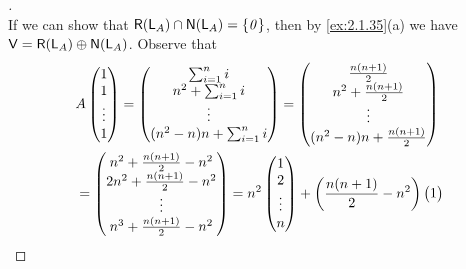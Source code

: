 \begin{proof}[]
\[	\]
	If we can show that \(\rg{\L_A} \cap \ns{\L_A} = \set{\zv}\), then by \cref{ex:2.1.35}(a) we have \(\V = \rg{\L_A} \oplus \ns{\L_A}\).
	Observe that
	\begin{align*}
		 & A \begin{pmatrix}
			     1      \\
			     1      \\
			     \vdots \\
			     1
		     \end{pmatrix} = \begin{pmatrix}
			                     \sum_{i = 1}^n i       \\
			                     n^2 + \sum_{i = 1}^n i \\
			                     \vdots                 \\
			                     (n^2 - n) n + \sum_{i = 1}^n i
		                     \end{pmatrix} = \begin{pmatrix}
			                                     \frac{n(n + 1)}{2}       \\
			                                     n^2 + \frac{n(n + 1)}{2} \\
			                                     \vdots                   \\
			                                     (n^2 - n) n + \frac{n(n + 1)}{2}
		                                     \end{pmatrix}                  \\
		 & = \begin{pmatrix}
			     n^2 + \frac{n(n + 1)}{2} - n^2  \\
			     2n^2 + \frac{n(n + 1)}{2} - n^2 \\
			     \vdots                          \\
			     n^3 + \frac{n(n + 1)}{2} - n^2
		     \end{pmatrix} = n^2 \begin{pmatrix}
			                         1      \\
			                         2      \\
			                         \vdots \\
			                         n
		                         \end{pmatrix} + \left\lparen\frac{n(n + 1)}{2} - n^2\right\rparen \begin{pmatrix}
			                                                                       1      \\

\end{pmatrix}
\end{align*}
\end{proof}
